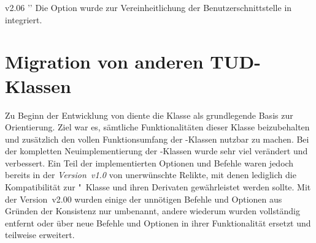 \begin{Obsolete}{v2.06}{}%
  ''
\printdeclarationlist%
%
Die Option  wurde zur Vereinheitlichung der 
Benutzerschnittstelle in  integriert.
\end{Obsolete}



\section[%
  Das Paket \PackageRaw{tudscrcomp}{\BooleanFalse}
  -- Migration von anderen TUD-Klassen%
]{Migration von anderen TUD-Klassen}
%
\begin{Entity*}{}
%
%

\noindent{}

\bigskip\noindent
Zu Beginn der Entwicklung von \TUDScript diente die Klasse  als 
grundlegende Basis zur Orientierung. Ziel war es, sämtliche Funktionalitäten 
dieser Klasse beizubehalten und zusätzlich den vollen Funktionsumfang der 
\KOMAScript-Klassen nutzbar zu machen. Bei der kompletten Neuimplementierung 
der \TUDScript-Klassen wurde sehr viel verändert und verbessert. Ein Teil der 
implementierten Optionen und Befehle waren jedoch bereits in der 
\emph{Version~v1.0} von \TUDScript unerwünschte Relikte, mit denen lediglich 
die Kompatibilität zur "~Klasse und ihren Derivaten 
gewährleistet werden sollte. Mit der Version~v2.00 wurden einige der unnötigen 
Befehle und Optionen aus Gründen der Konsistenz nur umbenannt, andere wiederum 
wurden vollständig entfernt oder über neue Befehle und Optionen in ihrer 
Funktionalität ersetzt und teilweise erweitert. 


\end{Entity*}
